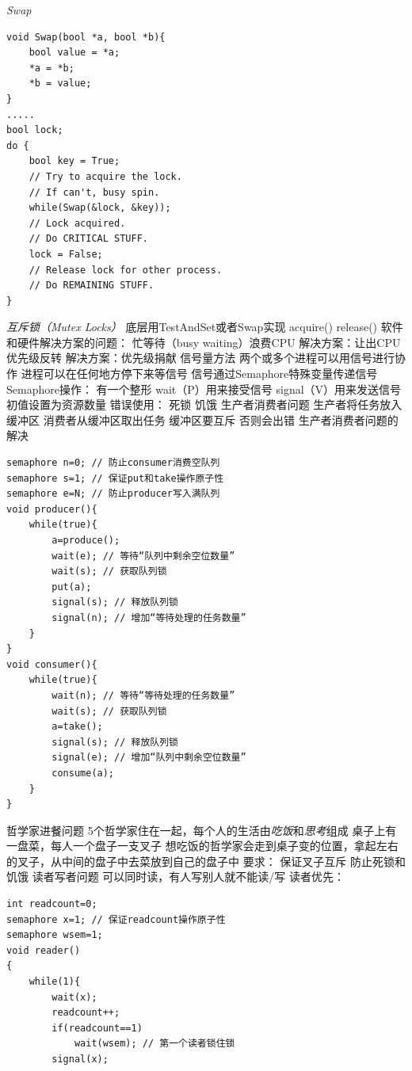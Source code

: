 \documentclass{ctexart}
\begin{document}
\begin{outline}
    \1 \emph{Swap}
    \begin{verbatim}
void Swap(bool *a, bool *b){
    bool value = *a;
    *a = *b;
    *b = value;
}
.....
bool lock;
do {
    bool key = True;
    // Try to acquire the lock.
    // If can't, busy spin.
    while(Swap(&lock, &key));
    // Lock acquired.
    // Do CRITICAL STUFF.
    lock = False;
    // Release lock for other process.
    // Do REMAINING STUFF.
}
    \end{verbatim}
    \1 \emph{互斥锁（Mutex Locks）}
        \2 底层用TestAndSet或者Swap实现
        \2 acquire()
        \2 release()
    \1 软件和硬件解决方案的问题：
        \2 忙等待（busy waiting）浪费CPU
            \3 解决方案：让出CPU
        \2 优先级反转
            \3 解决方案：优先级捐献
    \1 信号量方法
        \2 两个或多个进程可以用信号进行协作
        \2 进程可以在任何地方停下来等信号
        \2 信号通过Semaphore特殊变量传递信号
        \2 Semaphore操作：
            \3 有一个整形
            \3 wait（P）用来接受信号
            \3 signal（V）用来发送信号
            \3 初值设置为资源数量
        \2 错误使用：
            \3 死锁
            \3 饥饿
    \1 生产者消费者问题
        \2 生产者将任务放入缓冲区
        \2 消费者从缓冲区取出任务
        \2 缓冲区要互斥
            \3 否则会出错
        \2 生产者消费者问题的解决
        \begin{verbatim}
semaphore n=0; // 防止consumer消费空队列
semaphore s=1; // 保证put和take操作原子性
semaphore e=N; // 防止producer写入满队列
void producer(){
    while(true){
        a=produce();
        wait(e); // 等待“队列中剩余空位数量”
        wait(s); // 获取队列锁
        put(a);
        signal(s); // 释放队列锁
        signal(n); // 增加“等待处理的任务数量”
    }
}
void consumer(){
    while(true){
        wait(n); // 等待“等待处理的任务数量”
        wait(s); // 获取队列锁
        a=take();
        signal(s); // 释放队列锁
        signal(e); // 增加“队列中剩余空位数量”
        consume(a);
    }
}
        \end{verbatim}
    \1 哲学家进餐问题
        \2 5个哲学家住在一起，每个人的生活由\emph{吃饭}和\emph{思考}组成
        \2 桌子上有一盘菜，每人一个盘子一支叉子
        \2 想吃饭的哲学家会走到桌子变的位置，拿起左右的叉子，从中间的盘子中去菜放到自己的盘子中
        \2 要求：
            \3 保证叉子互斥
            \3 防止死锁和饥饿
    \1 读者写者问题
        \2 可以同时读，有人写别人就不能读/写
        \2 读者优先：
        \begin{verbatim}
int readcount=0;
semaphore x=1; // 保证readcount操作原子性
semaphore wsem=1;
void reader()
{
    while(1){
        wait(x);
        readcount++;
        if(readcount==1)
            wait(wsem); // 第一个读者锁住锁
        signal(x);


\end{verbatim}
\end{outline}
\end{document}
